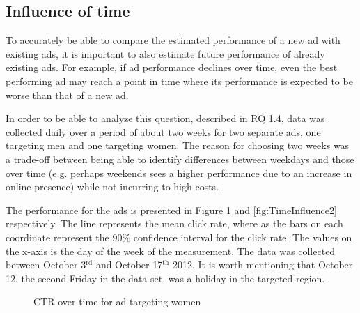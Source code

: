 \documentclass{sig-alternate}
\newcommand{\superscript}[1]{\ensuremath{^{\textrm{#1}}}}
\begin{document}
\subsection{Influence of time}
To accurately be able to compare the estimated performance of a new ad with existing ads, it is important to also estimate future performance of already existing ads. For example, if ad performance declines over time, even the best performing ad may reach a point in time where its performance is expected to be worse than that of a new ad.

In order to be able to analyze this question, described in RQ 1.4, data was collected daily over a period of about two weeks for two separate ads, one targeting men and one targeting women. The reason for choosing two weeks was a trade-off between being able to identify differences between weekdays and those over time (e.g. perhaps weekends sees a higher performance due to an increase in online presence) while not incurring to high costs.

The performance for the ads is presented in Figure \ref{fig:TimeInfluence1} and \ref{fig:TimeInfluence2} respectively. The line represents the mean click rate, where as the bars on each coordinate represent the 90\% confidence interval for the click rate. The values on the x-axis is the day of the week of the measurement. The data was collected between October 3\superscript{rd} and October 17\superscript{th} 2012. It is worth mentioning that October 12, the second Friday in the data set, was a holiday in the targeted region.

\begin{figure}[htb]
\begin{center}

	\caption{CTR over time for ad targeting women}
	\label{fig:TimeInfluence1}
\end{center}
\end{figure}
\end{document}
